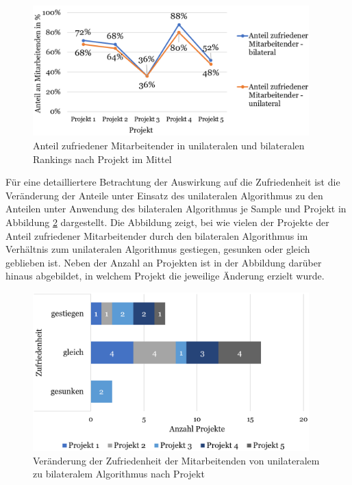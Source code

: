 \begin{figure}[H]
    \centering
	\includegraphics[width=0.95\textwidth]{gfx/verhaeltnis-z-durchschnitt-projekte.png}
	\caption[Anteil zufriedener Mitarbeitender in unilateralen und bilateralen Rankings nach Projekt im Mittel]{Anteil zufriedener Mitarbeitender in unilateralen und bilateralen Rankings nach Projekt im Mittel}
	\label{fig:ergebnisse:abb8}
\end{figure}

Für eine detailliertere Betrachtung der Auswirkung auf die Zufriedenheit ist die Veränderung der Anteile unter Einsatz des unilateralen Algorithmus zu den Anteilen unter Anwendung des bilateralen Algorithmus je Sample und Projekt in Abbildung \ref{fig:ergebnisse:abb9} dargestellt.
Die Abbildung zeigt, bei wie vielen der Projekte der Anteil zufriedener Mitarbeitender durch den bilateralen Algorithmus im Verhältnis zum unilateralen Algorithmus gestiegen, gesunken oder gleich geblieben ist.
Neben der Anzahl an Projekten ist in der Abbildung darüber hinaus abgebildet, in welchem Projekt die jeweilige Änderung erzielt wurde.

\begin{figure}[H]
    \centering
	\includegraphics[width=0.95\textwidth]{gfx/verhaeltnis-z-projekte.png}
	\caption[Veränderung der Zufriedenheit der Mitarbeitenden von unilateralem zu bilateralem Algorithmus nach Projekt]{Veränderung der Zufriedenheit der Mitarbeitenden von unilateralem zu bilateralem Algorithmus nach Projekt}
	\label{fig:ergebnisse:abb9}
\end{figure}

